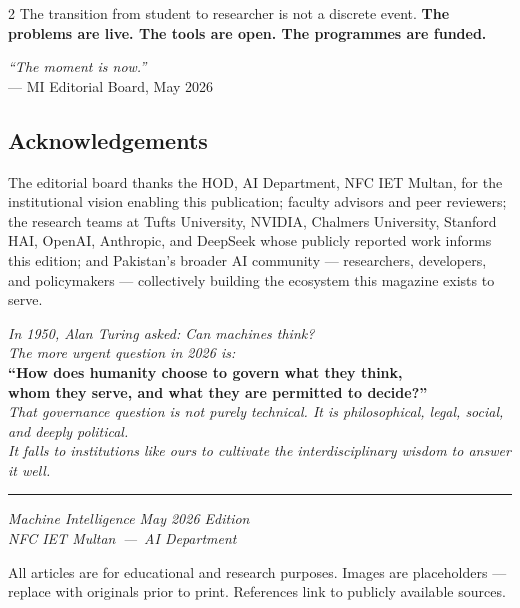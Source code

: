 \documentclass[10pt, a4paper]{article}
\newcommand{\ruled}{%
  \par\vspace{0.3em}%
  \noindent{\color{electric}\rule{\linewidth}{0.4pt}}\par
  \vspace{0.3em}}
\begin{document}
\begin{multicols}{2}
{\small
The transition from student to researcher is not a discrete event.
\textbf{The problems are live. The tools are open. The programmes are funded.}
}

\begin{pullquote}
  {\small\itshape\color{white}
  ``The moment is now.''}\\[4pt]
  {\footnotesize\color{electric}--- MI Editorial Board, May 2026}
\end{pullquote}

\ruled

\subsection*{Acknowledgements}

{\small
The editorial board thanks the HOD, AI Department, NFC IET Multan, for the institutional vision enabling this publication; faculty advisors and peer reviewers; the research teams at Tufts University, NVIDIA, Chalmers University, Stanford HAI, OpenAI, Anthropic, and DeepSeek whose publicly reported work informs this edition; and Pakistan's broader AI community --- researchers, developers, and policymakers --- collectively building the ecosystem this magazine exists to serve.
}

\end{multicols}
\ruled

\begin{center}
  {\small\itshape\color{midgray}
    In 1950, Alan Turing asked: \textit{Can machines think?}\\
    The more urgent question in 2026 is:\\[4pt]
  }
  {\large\bfseries\color{navydeep}
    ``How does humanity choose to govern what they think,\\
    whom they serve, and what they are permitted to decide?''
  }\\[8pt]
  {\small\itshape\color{midgray}
    That governance question is not purely technical.
    It is philosophical, legal, social, and deeply political.\\
    It falls to institutions like ours to cultivate the interdisciplinary
    wisdom to answer it well.
  }
\end{center}

\vspace{0.4em}
{\color{electric}\rule{\linewidth}{1.5pt}}
\vspace{0.4em}

\begin{center}
  {\small\itshape Machine Intelligence}\quad
  {\small\color{cobalt}\textbullet}\quad
  {\small\itshape May 2026 Edition}\\[4pt]
  {\small\itshape NFC IET Multan\ ---\ AI Department}\\[6pt]
  \parbox{0.85\linewidth}{\centering
    \scriptsize\color{midgray}
    All articles are for educational and research purposes.
    Images are placeholders --- replace with originals prior to print.
    References link to publicly available sources.
  }
\end{center}
\end{document}
